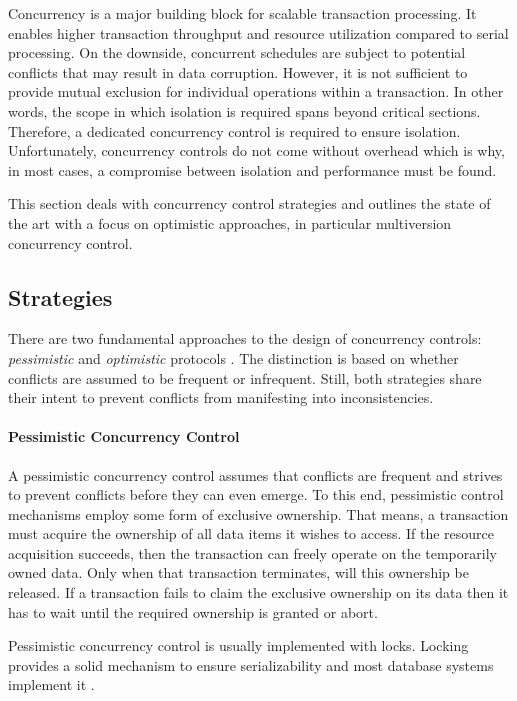 Concurrency is a major building block for scalable transaction processing. It
enables higher transaction throughput and resource utilization compared to
serial processing. On the downside, concurrent schedules are subject to
potential conflicts that may result in data corruption. However, it is not
sufficient to provide mutual exclusion for individual operations within a
transaction. In other words, the scope in which isolation is required spans
beyond critical sections. Therefore, a dedicated concurrency control is required
to ensure isolation. Unfortunately, concurrency controls do not come without
overhead which is why, in most cases, a compromise between isolation and
performance must be found.

This section deals with concurrency control strategies and outlines the state of
the art with a focus on optimistic approaches, in particular multiversion
concurrency control.

\subsection{Strategies}

There are two fundamental approaches to the design of concurrency controls:
\emph{pessimistic} and \emph{optimistic} protocols \cite{kung1981optimistic,
larson2011high, sadoghi2014reducing}. The distinction is based on whether
conflicts are assumed to be frequent or infrequent. Still, both strategies share
their intent to prevent conflicts from manifesting into inconsistencies.

\paragraph{Pessimistic Concurrency Control}

A pessimistic concurrency control assumes that conflicts are frequent and
strives to prevent conflicts before they can even emerge. To this end,
pessimistic control mechanisms employ some form of exclusive ownership. That
means, a transaction must acquire the ownership of all data items it wishes to
access. If the resource acquisition succeeds, then the transaction can freely
operate on the temporarily owned data. Only when that transaction terminates,
will this ownership be released. If a transaction fails to claim the exclusive
ownership on its data then it has to wait until the required ownership is
granted or abort.

Pessimistic concurrency control is usually implemented with locks. Locking
provides a solid mechanism to ensure serializability and most database systems
implement it \cite{kung1981optimistic, berenson1995critique, larson2011high}.

